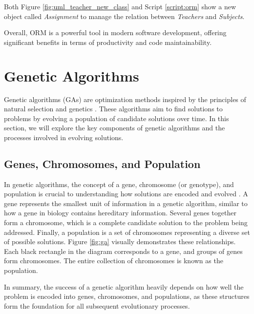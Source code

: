  Both Figure \ref{fig:uml_teacher_new_class} and Script \ref{script:orm}
 show a new object called \textit{Assignment} to manage the relation between \textit{Teachers} and \textit{Subjects}.


Overall, ORM is a powerful tool in modern software development, offering significant benefits in terms of productivity and code maintainability. %

    \section{Genetic Algorithms} \label{sec:ga}
    
    Genetic algorithms (GAs) are optimization methods inspired by the principles of natural selection and genetics \cite{holland1992adaptation}. These algorithms aim to find solutions to problems by evolving a population of candidate solutions over time. In this section, we will explore the key components of genetic algorithms and the processes involved in evolving solutions.
    
    \subsection{Genes, Chromosomes, and Population}
    
        In genetic algorithms, the concept of a gene, chromosome (or genotype), and population is crucial to understanding how solutions are encoded and evolved \cite{holland1992adaptation}. 
        A gene represents the smallest unit of information in a genetic algorithm, similar to how a gene in biology contains hereditary information. Several genes together form a chromosome, which is a complete candidate solution to the problem being addressed. Finally, a population is a set of chromosomes representing a diverse set of possible solutions.
        Figure \ref{fig:ga} visually demonstrates these relationships. Each black rectangle in the diagram corresponds to a gene, and groups of genes form chromosomes. The entire collection of chromosomes is known as the population.
        
        
        
        In summary, the success of a genetic algorithm heavily depends on how well the problem is encoded into genes, chromosomes, and populations, as these structures form the foundation for all subsequent evolutionary processes.
    
